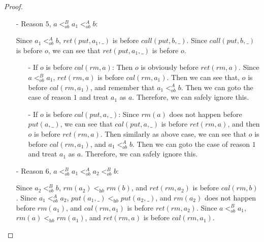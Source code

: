 \begin {proof}
\begin{itemize}
\item[-] Reason $5$, $a <_{\textit{ob}}^B a_1 <_{\textit{ob}}^A b$:

    Since $a_1 <_{\textit{ob}}^A b$, $\textit{ret}(\textit{put},a_1,\_)$ is before $\textit{call}(\textit{put},b,\_)$. Since $\textit{call}(\textit{put},b,\_)$ is before $o$, we can see that $\textit{ret}(\textit{put},a_1,\_)$ is before $o$.

    \begin{itemize}
    \setlength{\itemsep}{0.5pt}
    \item[-] If $o$ is before $\textit{cal}(\textit{rm},a)$: Then $o$ is obviously before $\textit{ret}(\textit{rm},a)$. Since $a <_{\textit{ob}}^B a_1$, $\textit{ret}(\textit{rm},a)$ is before $\textit{cal}(\textit{rm},a_1)$. Then we can see that, $o$ is before $\textit{cal}(\textit{rm},a_1)$, and remember that $a_1 <_{\textit{ob}}^A b$. Then we can goto the case of reason $1$ and treat $a_1$ as $a$. Therefore, we can safely ignore this.

    \item[-] If $o$ is before $\textit{cal}(\textit{put},a,\_)$: Since $\textit{rm}(a)$ does not happen before $\textit{put}(a,\_)$, we can see that $\textit{cal}(\textit{put},a,\_)$ is before $\textit{ret}(\textit{rm},a)$, and then $o$ is before $\textit{ret}(\textit{rm},a)$. Then similarly as above case, we can see that $o$ is before $\textit{cal}(\textit{rm},a_1)$, and $a_1 <_{\textit{ob}}^A b$. Then we can goto the case of reason $1$ and treat $a_1$ as $a$. Therefore, we can safely ignore this.
    \end{itemize}

\item[-] Reason $6$, $a <_{\textit{ob}}^B a_1 <_{\textit{ob}}^A a_2 <_{\textit{ob}}^B b$:

    Since $a_2 <_{\textit{ob}}^B b$, $\textit{rm}(a_2) <_{\textit{hb}} \textit{rm}(b)$, and $\textit{ret}(\textit{rm},a_2)$ is before $\textit{cal}(\textit{rm},b)$. %
    Since $a_1 <_{\textit{ob}}^A a_2$, $\textit{put}(a_1,\_) <_{\textit{hb}} \textit{put}(a_2,\_)$, and $\textit{rm}(a_2)$ does not happen before $\textit{rm}(a_1)$, and $\textit{cal}(\textit{rm},a_1)$ is before $\textit{ret}(\textit{rm},a_2)$. Since $a <_{\textit{ob}}^B a_1$, $\textit{rm}(a) <_{\textit{hb}} \textit{rm}(a_1)$, and $\textit{ret}(\textit{rm},a)$ is before $\textit{cal}(\textit{rm},a_1)$.


\end{itemize}
\end{proof}
